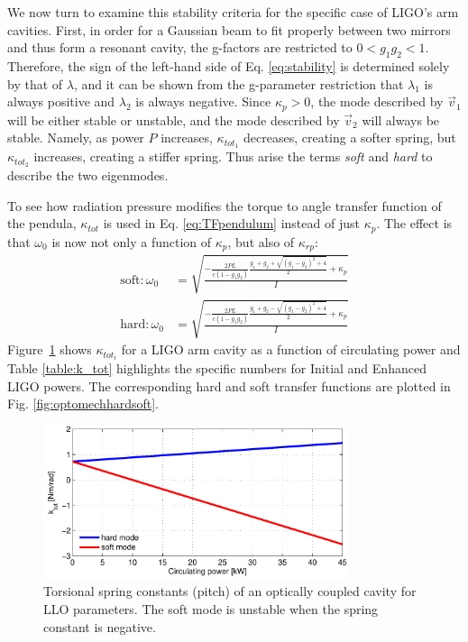 We now turn to examine this stability criteria for the specific case
of LIGO's arm cavities. First, in order for a Gaussian beam to fit
properly between two mirrors and thus form a resonant cavity, the
g-factors are restricted to $0 < g_1g_2 < 1$. Therefore, the sign of
the left-hand side of Eq. \ref{eq:stability} is determined solely by
that of $\lambda$, and it can be shown from the g-parameter
restriction that $\lambda_1$ is always positive and $\lambda_2$ is
always negative. Since $\kappa_p > 0$, the mode described by
$\vec{v}_1$ will be either stable or unstable, and the mode described
by $\vec{v}_2$ will always be stable. Namely, as power $P$ increases,
$\kappa_{tot_1}$ decreases, creating a softer spring, but
$\kappa_{tot_2}$ increases, creating a stiffer spring. Thus arise the
terms \emph{soft} and \emph{hard} to describe the two
eigenmodes. 

To see how radiation pressure modifies the torque to angle transfer
function of the pendula, $\kappa_{tot}$ is used in
Eq. \ref{eq:TFpendulum} instead of just $\kappa_{p}$. The effect is that $\omega_0$ is now
not only a function of $\kappa_p$, but also of $\kappa_{rp}$:
\begin{align}
\mathrm{soft: } \omega_0 &= \sqrt{\frac{- \frac{2 P L}{c (1-g_1 g_2)} \frac{g_1 + g_2 + \sqrt{(g_1 - g_2)^2 +
      4}}{2} + \kappa_p}{I}} \\
\mathrm{hard: } \omega_0 &= \sqrt{\frac{- \frac{2 P L}{c (1-g_1 g_2)} \frac{g_1 + g_2 - \sqrt{(g_1 - g_2)^2 +
      4}}{2} + \kappa_p}{I}}
\end{align}
Figure~\ref{fig:kf_hardsoft} shows $\kappa_{tot_i}$ for a LIGO arm
cavity as a function of circulating power and Table \ref{table:k_tot}
highlights the specific numbers for Initial and Enhanced LIGO
powers. The corresponding hard and soft transfer functions are plotted
in Fig. \ref{fig:optomechhardsoft}.


\begin{figure}
\begin{centering}
\includegraphics[width=0.8\textwidth]{figures/khardsoftLLO.pdf}
\caption{Torsional spring constants (pitch) of an optically coupled
  cavity for LLO parameters. The soft mode is unstable when the spring
  constant is negative.}
\label{fig:kf_hardsoft}
\end{centering}
\end{figure}



